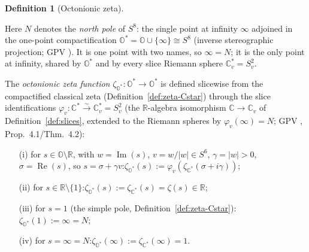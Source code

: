\documentclass[11pt]{article}
\newcommand{\OO}{\mathbb{O}}
\newcommand{\CC}{\mathbb{C}}
\newcommand{\RR}{\mathbb{R}}
\newcommand{\Ostar}{\OO^{*}}
\newcommand{\Cstar}{\CC^{*}}
\newcommand{\zetaO}{\zeta_{\Ostar}}
\newcommand{\zetaC}{\zeta_{\Cstar}}
\DeclareMathOperator{\re}{Re}
\DeclareMathOperator{\im}{Im}
\providecommand{\lean}[1]{}
\providecommand{\uses}[1]{}
\theoremstyle{plain}
\theoremstyle{definition}
\newtheorem{definition}[theorem]{Definition}
\theoremstyle{remark}
\begin{document}
\begin{definition}[Octonionic zeta]\label{def:zeta_O}
\lean{zetaO, zetaO_infty, zetaO_one, zetaO_sliceEmbed,
zetaO_sliceEmbed_of_im_neg, zetaO_ofReal}
\uses{def:zeta-Cstar, def:slices, thm:extension}
Here $N$ denotes the \emph{north pole} of $S^8$: the single point at infinity $\infty$
adjoined in the one-point compactification $\Ostar=\OO\cup\{\infty\}\cong S^8$ (inverse
stereographic projection; GPV \cite{VS}). It is one point with two names, so $\infty=N$;
it is the only point at infinity, shared by $\Ostar$ and by every slice Riemann sphere
$\CC_v^{*}=S^2_v$.

The \emph{octonionic zeta function} $\zetaO:\Ostar\to\Ostar$ is defined slicewise from the
compactified classical zeta (Definition~\ref{def:zeta-Cstar}) through the slice
identifications $\varphi_v:\Cstar\xrightarrow{\sim}\CC_v^{*}=S^2_v$ (the $\RR$-algebra
isomorphism $\CC\to\CC_v$ of Definition~\ref{def:slices}, extended to the Riemann spheres
by $\varphi_v(\infty)=N$; GPV \cite{VS}, Prop.~4.1/Thm.~4.2):
\begin{itemize}[leftmargin=2.2em]
\item[(i)] for $s\in\OO\setminus\RR$, with $w=\im(s)$, $v=w/|w|\in S^6$, $\gamma=|w|>0$,
  $\sigma=\re(s)$, so $s=\sigma+\gamma v$:\quad $\zetaO(s):=\varphi_v(\zetaC(\sigma+i\gamma))$;
\item[(ii)] for $s\in\RR\setminus\{1\}$:\quad $\zetaO(s):=\zetaC(s)=\zeta(s)\in\RR$;
\item[(iii)] for $s=1$ (the simple pole, Definition~\ref{def:zeta-Cstar}):\quad
  $\zetaO(1):=\infty=N$;
\item[(iv)] for $s=\infty=N$:\quad $\zetaO(\infty):=\zetaC(\infty)=1$.
\end{itemize}
\end{definition}
\end{document}

